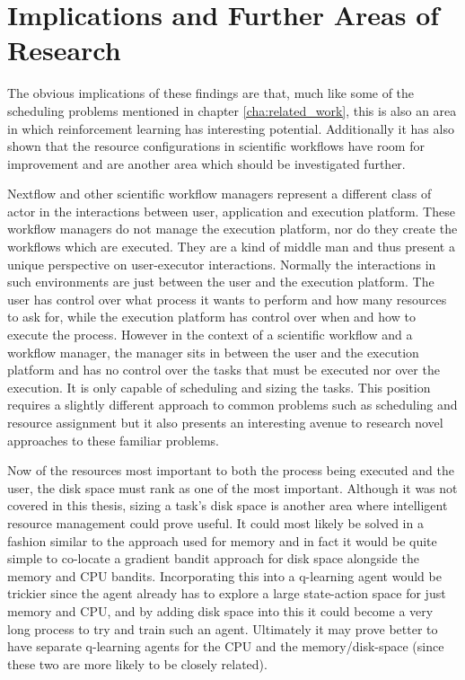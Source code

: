 \section{Implications and Further Areas of Research}
\label{sec:implications}

The obvious implications of these findings are that, much like some of the scheduling problems mentioned in chapter \ref{cha:related_work}, this is also an area in which reinforcement learning has interesting potential. Additionally it has also shown that the resource configurations in scientific workflows have room for improvement and are another area which should be investigated further.

Nextflow and other scientific workflow managers represent a different class of actor in the interactions between user, application and execution platform. These workflow managers do not manage the execution platform, nor do they create the workflows which are executed. They are a kind of middle man and thus present a unique perspective on user-executor interactions. Normally the interactions in such environments are just between the user and the execution platform. The user has control over what process it wants to perform and how many resources to ask for, while the execution platform has control over when and how to execute the process. However in the context of a scientific workflow and a workflow manager, the manager sits in between the user and the execution platform and has no control over the tasks that must be executed nor over the execution. It is only capable of scheduling and sizing the tasks. This position requires a slightly different approach to common problems such as scheduling and resource assignment but it also presents an interesting avenue to research novel approaches to these familiar problems.

Now of the resources most important to both the process being executed and the user, the disk space must rank as one of the most important. Although it was not covered in this thesis, sizing a task’s disk space is another area where intelligent resource management could prove useful. It could most likely be solved in a fashion similar to the approach used for memory and in fact it would be quite simple to co-locate a gradient bandit approach for disk space alongside the memory and CPU bandits. Incorporating this into a q-learning agent would be trickier since the agent already has to explore a large state-action space for just memory and CPU, and by adding disk space into this it could become a very long process to try and train such an agent. Ultimately it may prove better to have separate q-learning agents for the CPU and the memory/disk-space (since these two are more likely to be closely related).

